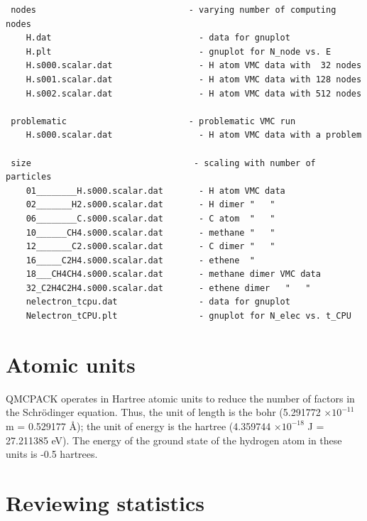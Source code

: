 \begin{shaded}
\begin{verbatim}
 nodes                              - varying number of computing nodes
    H.dat                             - data for gnuplot
    H.plt                             - gnuplot for N_node vs. E
    H.s000.scalar.dat                 - H atom VMC data with  32 nodes
    H.s001.scalar.dat                 - H atom VMC data with 128 nodes
    H.s002.scalar.dat                 - H atom VMC data with 512 nodes

 problematic                        - problematic VMC run
    H.s000.scalar.dat                 - H atom VMC data with a problem

 size                                - scaling with number of particles
    01________H.s000.scalar.dat       - H atom VMC data
    02_______H2.s000.scalar.dat       - H dimer "   "
    06________C.s000.scalar.dat       - C atom  "   "
    10______CH4.s000.scalar.dat       - methane "   "
    12_______C2.s000.scalar.dat       - C dimer "   "
    16_____C2H4.s000.scalar.dat       - ethene  " 
    18___CH4CH4.s000.scalar.dat       - methane dimer VMC data
    32_C2H4C2H4.s000.scalar.dat       - ethene dimer   "   "
    nelectron_tcpu.dat                - data for gnuplot
    Nelectron_tCPU.plt                - gnuplot for N_elec vs. t_CPU
\end{verbatim}
\end{shaded}


\section{Atomic units} 

QMCPACK operates in Hartree atomic units to reduce the
number of factors in the Schr\"odinger equation.  Thus, the unit of length is
the bohr (5.291772 $\times 10^{-11}$ m = 0.529177 \AA); the unit of energy is
the hartree (4.359744 $\times 10^{-18}$ J = 27.211385 eV).  The energy of the
ground state of the hydrogen atom in these units is -0.5 hartrees.



\section{Reviewing statistics}
\label{sec:review}

